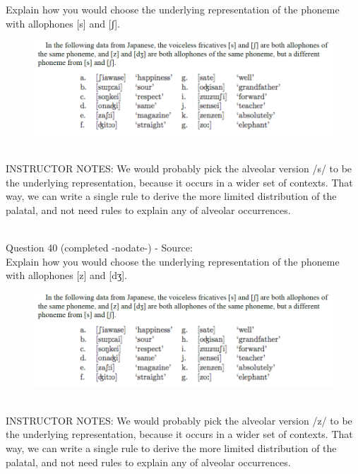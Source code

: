 \documentclass[12pt]{article}
\begin{document}
Explain how you would choose the underlying representation of the phoneme with allophones [s] and [ʃ].\\

\begin{figure}[H]
\includegraphics{../images/japanese.png}
\end{figure}

~\\
INSTRUCTOR NOTES: We would probably pick the alveolar version /s/ to be the underlying representation, because it occurs in a wider set of contexts. That way, we can write a single rule to derive the more limited distribution of the palatal, and not need rules to explain any of alveolar occurrences.


~\\

{\large Question 40} (completed -nodate-) - Source: \\

Explain how you would choose the underlying representation of the phoneme with allophones [z] and [dʒ].\\

\begin{figure}[H]
\includegraphics{../images/japanese.png}
\end{figure}

~\\
INSTRUCTOR NOTES: We would probably pick the alveolar version /z/ to be the underlying representation, because it occurs in a wider set of contexts. That way, we can write a single rule to derive the more limited distribution of the palatal, and not need rules to explain any of alveolar occurrences.
\end{document}
